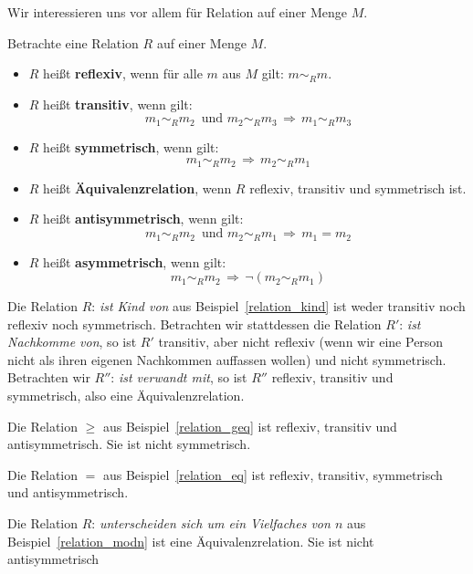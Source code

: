 Wir interessieren uns vor allem für Relation auf einer Menge $M$.

\begin{definition} Betrachte eine Relation $R$ auf einer Menge $M$.

\begin{itemize} 
\item $R$ heißt \textbf{reflexiv}, wenn für alle $m$ aus $M$ gilt: $m \sim_R m$.
\item $R$ heißt \textbf{transitiv}, wenn gilt: 
   	$$ m_1 \sim_R m_2 \, \textrm{ und } m_2 \sim_R m_3 \, \Longrightarrow \, m_1 \sim_R m_3 $$
\item $R$ heißt \textbf{symmetrisch}, wenn gilt:
   	$$ m_1 \sim_R m_2 \, \Longrightarrow \, m_2 \sim_R m_1 $$
\item $R$ heißt \textbf{Äquivalenzrelation}, wenn $R$ reflexiv, 
transitiv und symmetrisch ist.
\item $R$ heißt \textbf{antisymmetrisch}, wenn gilt:
   	$$ m_1 \sim_R m_2 \, \textrm{ und } m_2 \sim_R m_1 \, \Longrightarrow \, m_1 = m_2 $$
\item $R$ heißt \textbf{asymmetrisch}, wenn gilt:
   	$$ m_1 \sim_R m_2 \, \Longrightarrow \, \neg \left( m_2 \sim_R m_1 \right) $$
\end{itemize}
\end{definition}

\begin{beispiel} Die Relation $R$: \textit{ist Kind von} aus Beispiel~\ref{relation_kind} ist weder transitiv noch 
reflexiv noch symmetrisch. Betrachten wir stattdessen die Relation $R'$: \textit{ist Nachkomme von}, so ist $R'$ 
transitiv, aber nicht reflexiv (wenn wir eine Person nicht als ihren eigenen Nachkommen auffassen wollen) 
und nicht symmetrisch. Betrachten wir $R''$: \textit{ist verwandt mit}, so ist $R''$ reflexiv, transitiv und 
symmetrisch, also eine Äquivalenzrelation.

Die Relation $\geq$ aus Beispiel~\ref{relation_geq} ist reflexiv, transitiv und antisymmetrisch. Sie ist nicht 
symmetrisch.

Die Relation $=$ aus Beispiel~\ref{relation_eq} ist reflexiv, transitiv, symmetrisch und antisymmetrisch. 

Die Relation $R$: \textit{unterscheiden sich um ein Vielfaches von $n$} aus Beispiel~\ref{relation_modn} ist 
eine Äquivalenzrelation. Sie ist nicht antisymmetrisch
\end{beispiel}

